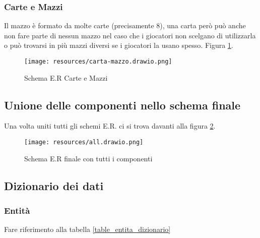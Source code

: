 \documentclass{article}
\begin{document}
\subsubsection{Carte e Mazzi}

Il mazzo è formato da molte carte (precisamente 8), una carta però può anche non fare parte di nessun mazzo nel caso che i giocatori non scelgano di utilizzarla o può trovarsi in più mazzi diversi se i giocatori la usano spesso. Figura \ref{fig_quarto_scheletro_ER}.

\begin{figure}
    \centering
    \texttt{[image: resources/carta-mazzo.drawio.png]}
    \caption{Schema E.R Carte e Mazzi}
    \label{fig_quarto_scheletro_ER}
\end{figure}

\subsection{Unione delle componenti nello schema finale}
Una volta uniti tutti gli schemi E.R. ci si trova davanti alla figura \ref{fig_full_ER}.

\begin{figure}
    \centering
    \texttt{[image: resources/all.drawio.png]}
    \caption{Schema E.R finale con tutti i componenti}
    \label{fig_full_ER}
\end{figure}

\subsection{Dizionario dei dati}

\subsubsection{Entità}
Fare riferimento alla tabella \ref{table_entita_dizionario}
\end{document}
